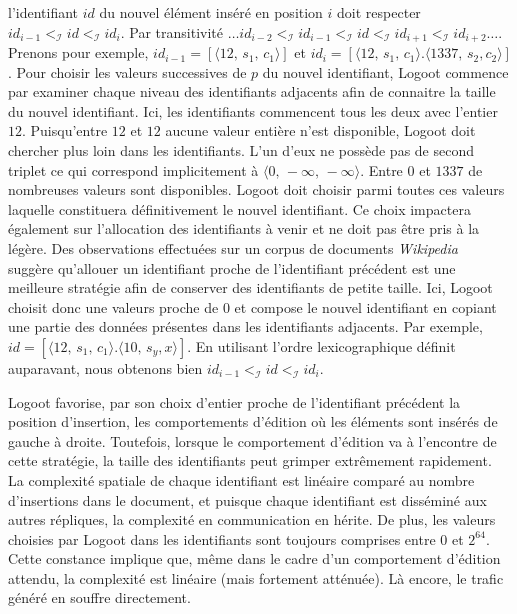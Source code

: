 l'identifiant $id$ du nouvel élément inséré en position $i$ doit respecter
$id_{i-1}<_\mathcal{I} id <_\mathcal{I} id_i$. Par transitivité
$\ldots id_{i-2} <_\mathcal{I} id_{i-1} <_\mathcal{I} id <_\mathcal{I} id_{i+1}
<_\mathcal{I} id_{i+2} \ldots$.
Prenons pour exemple, $id_{i-1}=[\langle 12,\,s_1,\,c_1\rangle]$ et
$id_{i}=[\langle 12,\, s_1,\,c_1\rangle.\langle 1337,\, s_2, c_2\rangle]$. Pour
choisir les valeurs successives de $p$ du nouvel identifiant, Logoot commence
par examiner chaque niveau des identifiants adjacents afin de connaitre la
taille du nouvel identifiant. Ici, les identifiants commencent tous les deux
avec l'entier $12$.  Puisqu'entre $12$ et $12$ aucune valeur entière n'est
disponible, Logoot doit chercher plus loin dans les identifiants. L'un d'eux ne
possède pas de second triplet ce qui correspond implicitement à
$\langle 0,\, -\infty ,\, -\infty \rangle$.  Entre $0$ et $1337$ de nombreuses
valeurs sont disponibles.  Logoot doit choisir parmi toutes ces valeurs laquelle
constituera définitivement le nouvel identifiant. Ce choix impactera également
sur l'allocation des identifiants à venir et ne doit pas être pris à la
légère. Des observations effectuées sur un corpus de documents
\emph{Wikipedia}~\cite{wikipedia} suggère qu'allouer un identifiant proche de
l'identifiant précédent est une meilleure stratégie afin de conserver des
identifiants de petite taille.  Ici, Logoot choisit donc une valeurs proche de
$0$ et compose le nouvel identifiant en copiant une partie des données présentes
dans les identifiants adjacents. Par exemple,
$id = [\langle 12,\, s_1,\,c_1 \rangle.\langle 10,\,s_y, x\rangle]$.  En
utilisant l'ordre lexicographique définit auparavant, nous obtenons bien
$id_{i-1} <_\mathcal{I} id <_\mathcal{I} id_i$.

\noindent Logoot favorise, par son choix d'entier proche de l'identifiant
précédent la position d'insertion, les comportements d'édition où les éléments
sont insérés de gauche à droite. Toutefois, lorsque le comportement d'édition va
à l'encontre de cette stratégie, la taille des identifiants peut grimper
extrêmement rapidement. La complexité spatiale de chaque identifiant est
linéaire comparé au nombre d'insertions dans le document, et puisque chaque
identifiant est disséminé aux autres répliques, la complexité en communication
en hérite. De plus, les valeurs choisies par Logoot dans les identifiants sont
toujours comprises entre $0$ et $2^{64}$. Cette constance implique que, même
dans le cadre d'un comportement d'édition attendu, la complexité est linéaire
(mais fortement atténuée). Là encore, le trafic généré en souffre directement.

